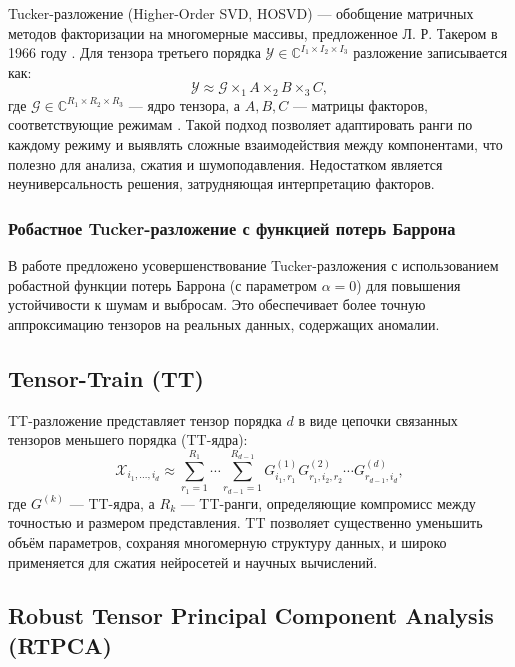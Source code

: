 Tucker-разложение (Higher-Order SVD, HOSVD) — обобщение матричных методов факторизации на многомерные массивы, предложенное Л. Р. Такером в 1966 году \cite{tucker_method}. Для тензора третьего порядка \(\mathcal{Y} \in \mathbb{C}^{I_1 \times I_2 \times I_3}\) разложение записывается как:
\[
\mathcal{Y} \approx \mathcal{G} \times_1 A \times_2 B \times_3 C,
\]
где \(\mathcal{G} \in \mathbb{C}^{R_1 \times R_2 \times R_3}\) — ядро тензора, а \(A, B, C\) — матрицы факторов, соответствующие режимам \cite{tucker_method}. Такой подход позволяет адаптировать ранги по каждому режиму и выявлять сложные взаимодействия между компонентами, что полезно для анализа, сжатия и шумоподавления. Недостатком является неуниверсальность решения, затрудняющая интерпретацию факторов.

\subsubsection*{Робастное Tucker-разложение с функцией потерь Баррона \cite{barron_loss_tensor_decomposition}}
\label{subsec:lr_barron_loss_tucker}

В работе \cite{barron_loss_tensor_decomposition} предложено усовершенствование Tucker-разложения с использованием робастной функции потерь Баррона \cite{barron2019generaladaptiverobustloss} (с параметром \(\alpha=0\)) для повышения устойчивости к шумам и выбросам. Это обеспечивает более точную аппроксимацию тензоров на реальных данных, содержащих аномалии.

\subsection*{Tensor-Train (TT)}
\label{subsec:lr_tt}

TT-разложение \cite{tensorly_tensor_train} представляет тензор порядка \(d\) в виде цепочки связанных тензоров меньшего порядка (TT-ядра):
\[
\mathcal{X}_{i_1,\ldots,i_d} \approx \sum_{r_1=1}^{R_1} \cdots \sum_{r_{d-1}=1}^{R_{d-1}} G^{(1)}_{i_1,r_1} G^{(2)}_{r_1,i_2,r_2} \cdots G^{(d)}_{r_{d-1},i_d},
\]
где \(G^{(k)}\) — TT-ядра, а \(R_k\) — TT-ранги, определяющие компромисс между точностью и размером представления. TT позволяет существенно уменьшить объём параметров, сохраняя многомерную структуру данных, и широко применяется для сжатия нейросетей и научных вычислений.

\subsection*{Robust Tensor Principal Component Analysis (RTPCA)}
\label{subsec:lr_rtpca}

